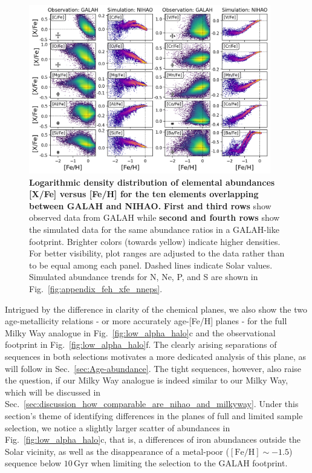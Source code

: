 \documentclass[fleqn,usenatbib]{mnras}
\begin{document}
\begin{figure}
	\includegraphics[width=0.94\textwidth]{figures/Overview_FeH_XFe_Obs_Sim.png}
    \caption{
    \textbf{Logarithmic density distribution of elemental abundances [X/Fe] versus [Fe/H] for the ten elements overlapping between GALAH and NIHAO.} 
    \textbf{First and third rows} show observed data from GALAH while \textbf{second and fourth rows} show the simulated data for the same abundance ratios in a GALAH-like footprint. Brighter colors (towards yellow) indicate higher densities. For better visibility, plot ranges are adjusted to the data rather than to be equal among each panel. Dashed lines indicate Solar values. Simulated abundance trends for N, Ne, P, and S are shown in Fig.~\ref{fig:appendix_feh_xfe_nneps}.}
    \label{fig:FeH_XFe}
\end{figure}

Intrigued by the difference in clarity of the chemical planes, we also show the two age-metallicity relations - or more accurately age-[Fe/H] planes - for the full Milky Way analogue in Fig.~\ref{fig:low_alpha_halo}c and the observational footprint in Fig.~\ref{fig:low_alpha_halo}f. The clearly arising separations of sequences in both selections motivates a more dedicated analysis of this plane, as will follow in Sec.~\ref{sec:Age-abundance}. The tight sequences, however, also raise the question, if our Milky Way analogue is indeed similar to our Milky Way, which will be discussed in Sec.~\ref{sec:discussion_how_comparable_are_nihao_and_milkyway}. Under this section's theme of identifying differences in the planes of full and limited sample selection, we notice a slightly larger scatter of abundances in Fig.~\ref{fig:low_alpha_halo}c, that is, a differences of iron abundances outside the Solar vicinity, as well as the disappearance of a metal-poor ($\mathrm{[Fe/H]} \sim -1.5$) sequence below $10\,\mathrm{Gyr}$ when limiting the selection to the GALAH footprint.
\end{document}

